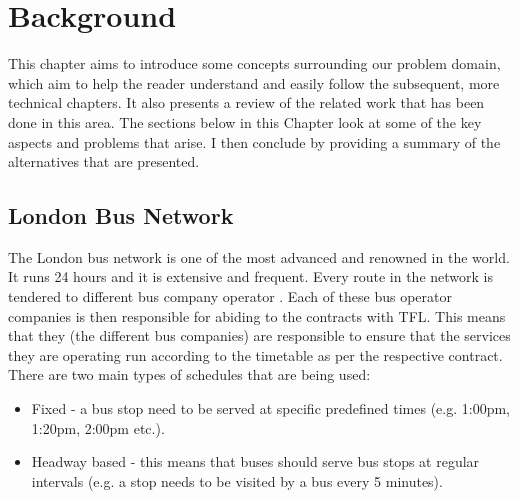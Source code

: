 \chapter{Background}
This chapter aims to introduce some concepts surrounding our problem domain, which aim to help the reader understand and easily follow the subsequent, more technical chapters. It also presents a review of the related work that has been done in this area. The sections below in this Chapter look at some of the key aspects and problems that arise. I then conclude by providing a summary of the alternatives that are presented.


\section{London Bus Network}
The London bus network is one of the most advanced and renowned in the world. It runs 24 hours and it is extensive and frequent. Every route in the network is tendered to different bus company operator \cite{busTendering}. Each of these bus operator companies is then responsible for abiding to the contracts with TFL. This means that they (the different bus companies) are responsible to ensure that the services they are operating run according to the timetable as per the respective contract. There are two main types of schedules that are being used:
\begin{itemize}
	\item Fixed - a bus stop need to be served at specific predefined times (e.g. 1:00pm, 1:20pm, 2:00pm etc.).
	\item Headway based - this means that buses should serve bus stops at regular intervals (e.g. a stop needs to be visited by a bus every 5 minutes).
\end{itemize}

